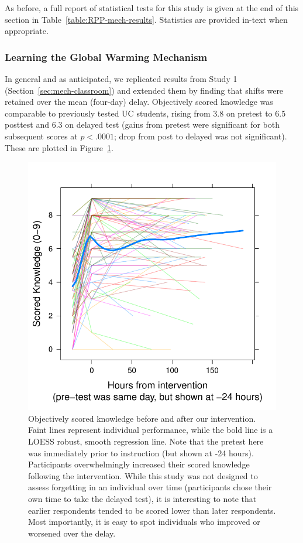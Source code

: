 As before, a full report of statistical tests for this study is given at the end of this
section in Table~\ref{table:RPP-mech-results}. Statistics are provided in-text
when appropriate.
    
\subsubsection{Learning the Global Warming Mechanism}

In general and as anticipated, we replicated results from Study 1
(Section~\ref{sec:mech-classroom}) and extended
them by finding that shifts were retained over the mean (four-day) delay.
Objectively scored knowledge was comparable to previously tested UC students,
rising from 3.8 on pretest to 6.5 posttest and 6.3 on delayed test (gains from
pretest were significant for both subsequent scores at $p<.0001$; drop from post
to delayed was not significant). These are plotted in
Figure~\ref{fig:RPP-mech-scored}. 

\begin{figure}
    \centering
    \includegraphics{RPP-mech-scored.pdf}
    \caption{Objectively scored knowledge before and after our intervention.
        Faint lines represent individual performance, while the bold line is a
        LOESS robust, smooth regression line. Note that the pretest here was
        immediately prior to instruction (but shown at -24 hours). Participants
        overwhelmingly increased their scored knowledge following the
        intervention. While this study was not designed to assess forgetting in
        an individual over time (participants chose their own time to take the
        delayed test), it is interesting to note that earlier
        respondents tended to be scored lower than later respondents. Most
        importantly, it is easy to spot individuals who improved or worsened
        over the delay.}
    \label{fig:RPP-mech-scored}
\end{figure}

